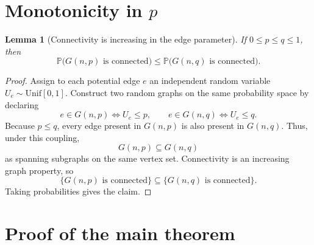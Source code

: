 \documentclass[11pt]{article}
\newcommand{\PP}{\mathbb{P}}
\theoremstyle{plain}
\newtheorem{lemma}[theorem]{Lemma}
\theoremstyle{definition}
\begin{document}
\section{Monotonicity in \texorpdfstring{$p$}{p}}

\begin{lemma}[Connectivity is increasing in the edge parameter]\label{lem:monotone}
If $0\le p\le q\le 1$, then
\[
\PP\bigl(G(n,p)\text{ is connected}\bigr)
\le
\PP\bigl(G(n,q)\text{ is connected}\bigr).
\]
\end{lemma}

\begin{proof}
Assign to each potential edge $e$ an independent random variable $U_e\sim \mathrm{Unif}[0,1]$.  Construct two random graphs on the same probability space by declaring
\[
e\in G(n,p) \iff U_e\le p,
\qquad
e\in G(n,q) \iff U_e\le q.
\]
Because $p\le q$, every edge present in $G(n,p)$ is also present in $G(n,q)$.  Thus, under this coupling,
\[
G(n,p)\subseteq G(n,q)
\]
as spanning subgraphs on the same vertex set.  Connectivity is an increasing graph property, so
\[
\{G(n,p)\text{ is connected}\}
\subseteq
\{G(n,q)\text{ is connected}\}.
\]
Taking probabilities gives the claim.
\end{proof}

\section{Proof of the main theorem}
\end{document}
